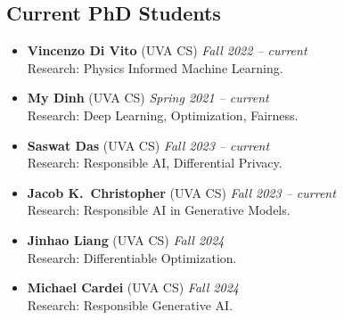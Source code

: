 \subsection*{Current PhD Students}
\begin{itemize}

  \item \textbf{Vincenzo Di Vito} ({\sc UVA} CS)
  \hfill{\em Fall 2022 -- current}\\
  {\sc Research:} Physics Informed Machine Learning.
  
  \item \textbf{My Dinh} ({\sc UVA} CS) 
  \hfill{\em Spring 2021 -- current}\\
  {\sc Research}: Deep Learning, Optimization, Fairness.

  \item \textbf{Saswat Das} ({\sc UVA} CS)
  \hfill{\em Fall 2023 -- current}\\
  {\sc Research:} Responsible AI, Differential Privacy.

  \item \textbf{Jacob K.~Christopher} ({\sc UVA} CS)
  \hfill{\em Fall 2023 -- current}\\
  {\sc Research:} Responsible AI in Generative Models.

  \item \textbf{Jinhao Liang} ({\sc UVA} CS)
  \hfill{\em Fall 2024}\\
  {\sc Research:} Differentiable Optimization.

  \item \textbf{Michael Cardei} ({\sc UVA} CS)
  \hfill{\em Fall 2024}\\
  {\sc Research:} Responsible Generative AI.

\end{itemize}


